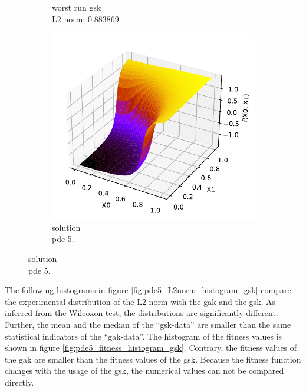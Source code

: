 \documentclass[./\jobname.tex]{subfiles}
\begin{document}
\begin{figure}[h]
\begin{subfigure}[b]{0.3333\linewidth}
		\caption{worst run \gls{gsk} \\L2 norm: 0.883869}
		\label{fig:pde5_ex3_best_solution_adaptive}
	\end{subfigure}%
	\begin{subfigure}[b]{0.3333\linewidth}
		\centering
		\includegraphics[width=1\textwidth]{../../code/testbed/pde5/sol_pde_5.pdf}
		\caption{solution \\ \gls{pde} 5.}
		\label{fig:pde5_analytical_solution_3}
	\end{subfigure}%
	\label{fig:pde5_ex3_compare_best_worst}
\end{figure}
The following histograms in figure \ref{fig:pde5_L2norm_histogram_gsk} compare the experimental distribution of the L2 norm with the \gls{gak} and the \gls{gsk}. As inferred from the Wilcoxon test, the distributions are significantly different. Further, the mean and the median of the ``\gls{gsk}-data'' are smaller than the same statistical indicators of the ``\gls{gak}-data''. The histogram of the fitness values is shown in figure \ref{fig:pde5_fitness_histogram_gsk}. Contrary, the fitness values of the \gls{gak} are smaller than the fitness values of the \gls{gsk}. Because the fitness function changes with the usage of the \gls{gsk}, the numerical values can not be compared directly. 
\end{document}

